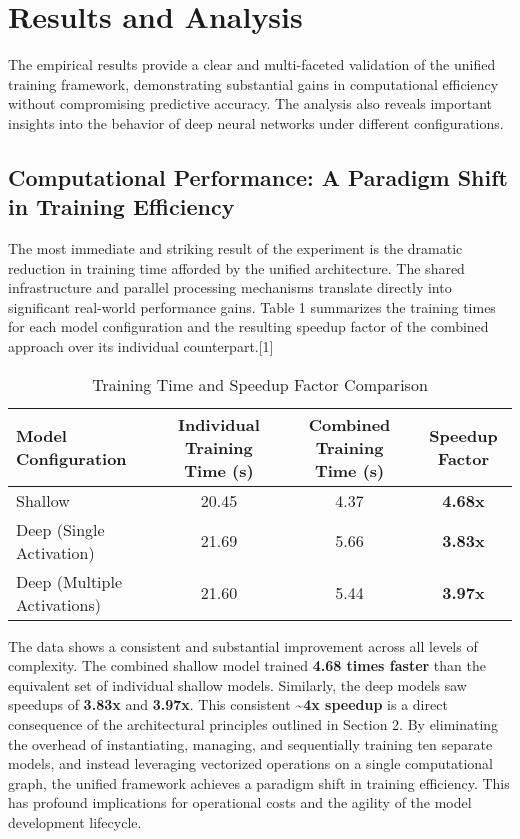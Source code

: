\documentclass{article}
\begin{document}
\section{Results and Analysis}

The empirical results provide a clear and multi-faceted validation of the unified training framework, demonstrating substantial gains in computational efficiency without compromising predictive accuracy. The analysis also reveals important insights into the behavior of deep neural networks under different configurations.

\subsection{Computational Performance: A Paradigm Shift in Training Efficiency}

The most immediate and striking result of the experiment is the dramatic reduction in training time afforded by the unified architecture. The shared infrastructure and parallel processing mechanisms translate directly into significant real-world performance gains. Table 1 summarizes the training times for each model configuration and the resulting speedup factor of the combined approach over its individual counterpart.[1]

\begin{table}[h!]
\centering
\caption{Training Time and Speedup Factor Comparison}
\begin{tabular}{@{}lccc@{}}
\toprule
Model Configuration & Individual Training Time (s) & Combined Training Time (s) & Speedup Factor \\
\midrule
Shallow & 20.45 & 4.37 & \textbf{4.68x} \\
Deep (Single Activation) & 21.69 & 5.66 & \textbf{3.83x} \\
Deep (Multiple Activations) & 21.60 & 5.44 & \textbf{3.97x} \\
\bottomrule
\end{tabular}
\label{tab:speedup}
\end{table}

The data shows a consistent and substantial improvement across all levels of complexity. The combined shallow model trained \textbf{4.68 times faster} than the equivalent set of individual shallow models. Similarly, the deep models saw speedups of \textbf{3.83x} and \textbf{3.97x}. This consistent \textbf{\textasciitilde4x speedup} is a direct consequence of the architectural principles outlined in Section 2. By eliminating the overhead of instantiating, managing, and sequentially training ten separate models, and instead leveraging vectorized operations on a single computational graph, the unified framework achieves a paradigm shift in training efficiency. This has profound implications for operational costs and the agility of the model development lifecycle.
\end{document}
